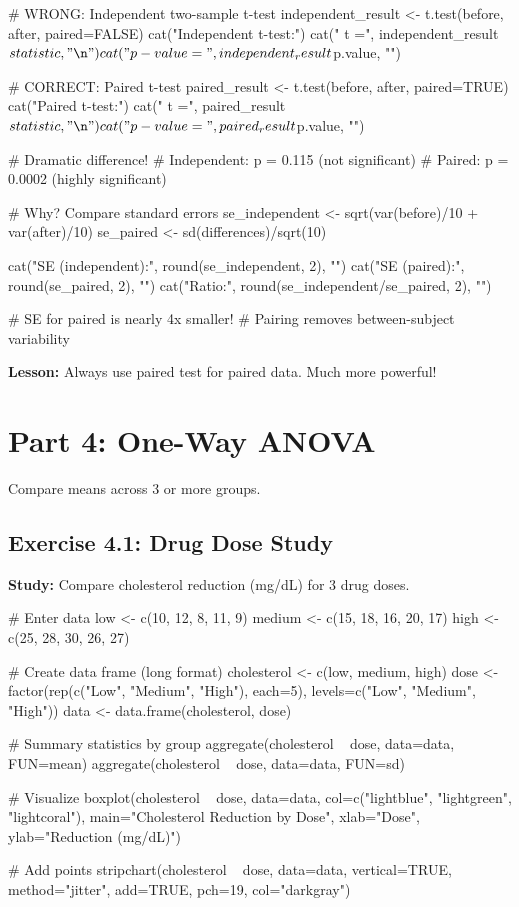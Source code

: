 \documentclass[11pt]{article}
\begin{document}
\begin{rcode}
# WRONG: Independent two-sample t-test
independent_result <- t.test(before, after, paired=FALSE)
cat("Independent t-test:\n")
cat("  t =", independent_result$statistic, "\n")
cat("  p-value =", independent_result$p.value, "\n\n")

# CORRECT: Paired t-test
paired_result <- t.test(before, after, paired=TRUE)
cat("Paired t-test:\n")
cat("  t =", paired_result$statistic, "\n")
cat("  p-value =", paired_result$p.value, "\n\n")

# Dramatic difference!
# Independent: p = 0.115 (not significant)
# Paired: p = 0.0002 (highly significant)

# Why? Compare standard errors
se_independent <- sqrt(var(before)/10 + var(after)/10)
se_paired <- sd(differences)/sqrt(10)

cat("SE (independent):", round(se_independent, 2), "\n")
cat("SE (paired):", round(se_paired, 2), "\n")
cat("Ratio:", round(se_independent/se_paired, 2), "\n")

# SE for paired is nearly 4x smaller!
# Pairing removes between-subject variability
\end{rcode}

\textbf{Lesson:} Always use paired test for paired data. Much more powerful!

\vspace{1cm}

\section{Part 4: One-Way ANOVA}

Compare means across 3 or more groups.

\subsection{Exercise 4.1: Drug Dose Study}

\textbf{Study:} Compare cholesterol reduction (mg/dL) for 3 drug doses.

\begin{rcode}
# Enter data
low <- c(10, 12, 8, 11, 9)
medium <- c(15, 18, 16, 20, 17)
high <- c(25, 28, 30, 26, 27)

# Create data frame (long format)
cholesterol <- c(low, medium, high)
dose <- factor(rep(c("Low", "Medium", "High"), each=5),
               levels=c("Low", "Medium", "High"))
data <- data.frame(cholesterol, dose)

# Summary statistics by group
aggregate(cholesterol ~ dose, data=data, FUN=mean)
aggregate(cholesterol ~ dose, data=data, FUN=sd)

# Visualize
boxplot(cholesterol ~ dose, data=data,
        col=c("lightblue", "lightgreen", "lightcoral"),
        main="Cholesterol Reduction by Dose",
        xlab="Dose", ylab="Reduction (mg/dL)")

# Add points
stripchart(cholesterol ~ dose, data=data,
           vertical=TRUE, method="jitter", add=TRUE,
           pch=19, col="darkgray")
\end{rcode}
\end{document}
